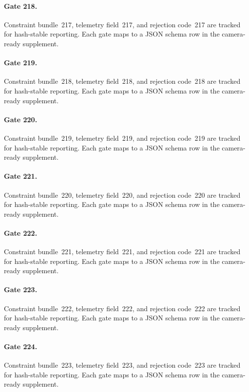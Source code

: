 \documentclass[sigconf,nonacm]{acmart}
\begin{document}
\paragraph{Gate 218.}
Constraint bundle~217, telemetry field~217, and rejection code~217 are tracked for hash-stable reporting. Each gate maps to a JSON schema row in the camera-ready supplement. %

\paragraph{Gate 219.}
Constraint bundle~218, telemetry field~218, and rejection code~218 are tracked for hash-stable reporting. Each gate maps to a JSON schema row in the camera-ready supplement. %

\paragraph{Gate 220.}
Constraint bundle~219, telemetry field~219, and rejection code~219 are tracked for hash-stable reporting. Each gate maps to a JSON schema row in the camera-ready supplement. %

\paragraph{Gate 221.}
Constraint bundle~220, telemetry field~220, and rejection code~220 are tracked for hash-stable reporting. Each gate maps to a JSON schema row in the camera-ready supplement. %

\paragraph{Gate 222.}
Constraint bundle~221, telemetry field~221, and rejection code~221 are tracked for hash-stable reporting. Each gate maps to a JSON schema row in the camera-ready supplement. %

\paragraph{Gate 223.}
Constraint bundle~222, telemetry field~222, and rejection code~222 are tracked for hash-stable reporting. Each gate maps to a JSON schema row in the camera-ready supplement. %

\paragraph{Gate 224.}
Constraint bundle~223, telemetry field~223, and rejection code~223 are tracked for hash-stable reporting. Each gate maps to a JSON schema row in the camera-ready supplement. %
\end{document}
